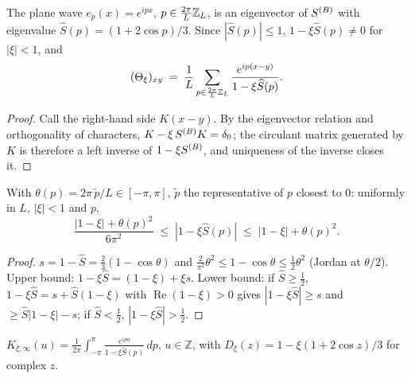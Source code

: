 \begin{lemma}\label{eq:B.1}
  \leanok{}
  The plane wave $e_p(x)=e^{ipx}$, $p\in\frac{2\pi}{L}\mathbb{Z}_L$, is an eigenvector of
  $S^{(B)}$ with eigenvalue $\widehat S(p)=(1+2\cos p)/3$.  Since $|\widehat S(p)|\le 1$,
  $1-\xi\widehat S(p)\neq 0$ for $|\xi|<1$, and
  \[ (\Theta_\xi)_{xy} \;=\; \frac1L\sum_{p\in\frac{2\pi}{L}\mathbb{Z}_L}
     \frac{e^{ip(x-y)}}{1-\xi\widehat S(p)} . \]
\end{lemma}
\begin{proof}\leanok{}
  Call the right-hand side $K(x-y)$.  By the eigenvector relation and orthogonality
  of characters, $K-\xi\,S^{(B)} K=\delta_0$; the circulant matrix generated by $K$ is
  therefore a left inverse of $1-\xi S^{(B)}$, and uniqueness of the inverse closes it.
\end{proof}

\begin{lemma}\label{eq:B.3}
  \leanok
  With $\theta(p)=2\pi\,\tilde p/L\in[-\pi,\pi]$, $\tilde p$ the representative of $p$ closest
  to $0$: uniformly in $L$, $|\xi|<1$ and $p$,
  \[ \frac{|1-\xi|+\theta(p)^2}{6\pi^2} \;\le\; |1-\xi\widehat S(p)| \;\le\;
     |1-\xi|+\theta(p)^2 . \]
\end{lemma}
\begin{proof}\leanok{}
  $s=1-\widehat S=\frac23(1-\cos\theta)$ and $\frac{2}{\pi^2}\theta^2\le1-\cos\theta\le
  \frac12\theta^2$ (Jordan at $\theta/2$).  Upper bound: $1-\xi\widehat S=(1-\xi)+\xi s$.
  Lower bound: if $\widehat S\ge\frac12$, $1-\xi\widehat S=s+\widehat S(1-\xi)$ with
  $\operatorname{Re}(1-\xi)>0$ gives $|1-\xi\widehat S|\ge s$ and
  $\ge\widehat S|1-\xi|-s$; if $\widehat S<\frac12$, $|1-\xi\widehat S|>\frac12$.
\end{proof}

\begin{definition}\label{eq:B.2}
  \leanok
  $K_{\xi,\infty}(u)=\frac1{2\pi}\int_{-\pi}^{\pi}\frac{e^{ipu}}{1-\xi\widehat S(p)}\,dp$,
  $u\in\mathbb Z$, with $D_\xi(z)=1-\xi(1+2\cos z)/3$ for complex $z$.
\end{definition}

